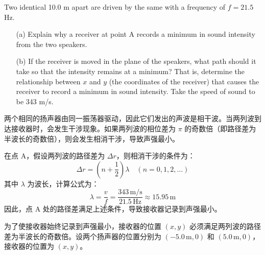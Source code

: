\begin{solution}
    Two identical  10.0 m apart are driven by the same  with a frequency of \( f = 21.5 \) Hz.
    \begin{center}
	\end{center}
	\begin{enumerate}
		\item[(a)] Explain why a receiver at point A records a minimum in sound intensity from the two speakers.
		\item[(b)] If the receiver is moved in the plane of the speakers, what path should it take so that the intensity remains at a minimum? That is, determine the relationship between \( x \) and \( y \) (the coordinates of the receiver) that causes the receiver to record a minimum in sound intensity. Take the speed of sound to be 343 m/s.
	\end{enumerate}
    \tcbrule
	两个相同的扬声器由同一振荡器驱动，因此它们发出的声波是相干波。当两列波到达接收器时，会发生干涉现象。如果两列波的相位差为 \( \pi \) 的奇数倍（即路径差为半波长的奇数倍），则会发生相消干涉，导致声强最小。

	在点 A，假设两列波的路径差为 \( \Delta r \)，则相消干涉的条件为：
	\[
	\Delta r = \left( n + \frac{1}{2} \right) \lambda \quad (n = 0, 1, 2, \dots)
	\]
	其中 \( \lambda \) 为波长，计算公式为：
	\[
	\lambda = \frac{v}{f} = \frac{343 \, \text{m/s}}{21.5 \, \text{Hz}} \approx 15.95 \, \text{m}
	\]
	因此，点 A 处的路径差满足上述条件，导致接收器记录到声强最小。

	为了使接收器始终记录到声强最小，接收器的位置 \( (x, y) \) 必须满足两列波的路径差为半波长的奇数倍。设两个扬声器的位置分别为 \( (-5.0 \, \text{m}, 0) \) 和 \( (5.0 \, \text{m}, 0) \)，接收器的位置为 \( (x, y) \)。


\end{solution}
